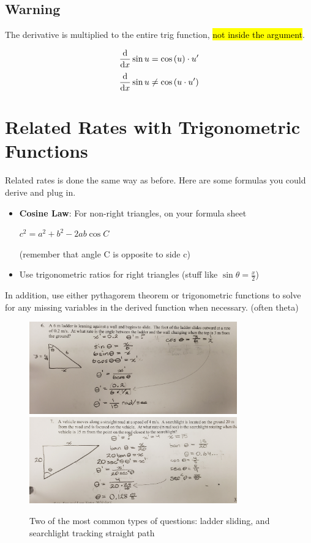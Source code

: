 \documentclass[a4paper,12pt]{article}
\begin{document}
\subsection{Warning}
The derivative is multiplied to the entire trig function, \hl{not inside the argument}.

$$\dv{}{x} \sin{u} = \cos{(u)} \cdot u'$$
$$\dv{}{x} \sin{u} \neq \cos{(u \cdot u')}$$

\section{Related Rates with Trigonometric Functions}
Related rates is done the same way as before. Here are some formulas you could derive and plug in.

\begin{itemize}
    \item{
        \textbf{Cosine Law}: For non-right triangles, on your formula sheet

        $c^2 = a^2 + b^2 - 2ab\cos{C}$

        (remember that angle C is opposite to side c)
    }
\item{Use trigonometric ratios for right triangles (stuff like $\sin{\theta} = \frac{x}{2}$)}
\end{itemize}

In addition, use either pythagorem theorem or trigonometric functions to solve for any missing variables in the derived function when necessary. (often theta)

\begin{figure}[H]
    \centering
    \includegraphics[width=0.8\textwidth]{ladder}
    \includegraphics[width=0.8\textwidth]{light}
    \caption{Two of the most common types of questions: ladder sliding, and searchlight tracking straight path}
\end{figure}
\end{document}
